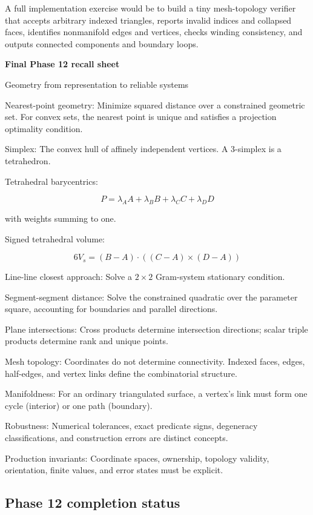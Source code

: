 A full implementation exercise would be to build a tiny mesh-topology verifier that accepts arbitrary indexed triangles, reports invalid indices and collapsed faces, identifies nonmanifold edges and vertices, checks winding consistency, and outputs connected components and boundary loops.

\textbf{Final Phase 12 recall sheet}

Geometry from representation to reliable systems

Nearest-point geometry: Minimize squared distance over a constrained geometric set. For convex sets, the nearest point is unique and satisfies a projection optimality condition.

Simplex: The convex hull of affinely independent vertices. A 3-simplex is a tetrahedron.

Tetrahedral barycentrics:

\[
P=\lambda_AA+\lambda_BB+\lambda_CC+\lambda_DD
\]

with weights summing to one.

Signed tetrahedral volume:

\[
6V_s=(B-A)\cdot((C-A)\times(D-A))
\]

Line-line closest approach: Solve a \(2\times2\) Gram-system stationary condition.

Segment-segment distance: Solve the constrained quadratic over the parameter square, accounting for boundaries and parallel directions.

Plane intersections: Cross products determine intersection directions; scalar triple products determine rank and unique points.

Mesh topology: Coordinates do not determine connectivity. Indexed faces, edges, half-edges, and vertex links define the combinatorial structure.

Manifoldness: For an ordinary triangulated surface, a vertex's link must form one cycle (interior) or one path (boundary).

Robustness: Numerical tolerances, exact predicate signs, degeneracy classifications, and construction errors are distinct concepts.

Production invariants: Coordinate spaces, ownership, topology validity, orientation, finite values, and error states must be explicit.

\subsection{Phase 12 completion status}\label{04-visual-computing-ii-ch023-phase-12-completion-status}

